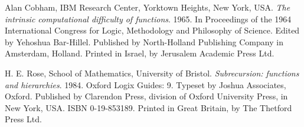 \begin{thebibliography}{9} %


Alan Cobham, IBM Research Center, Yorktown Heights, New York, USA. \emph{The
intrinsic computational difficulty of functions}. 1965. In Proceedings of the
1964 International Congress for Logic, Methodology and Philosophy of Science.
Edited by Yehoshua Bar-Hillel. Published by North-Holland Publishing Company in
Amsterdam, Holland.  Printed in Israel, by Jerusalem Academic Press Ltd.


H. E. Rose, School of Mathematics, University of Bristol. \emph{Subrecursion:
functions and hierarchies}. 1984. Oxford Logix Guides: 9. Typeset by Joshua
Associates, Oxford.  Published by Clarendon Press, division of Oxford
University Press, in New York, USA. ISBN 0-19-853189. Printed in Great Britain,
by The Thetford Press Ltd.

\end{thebibliography}
